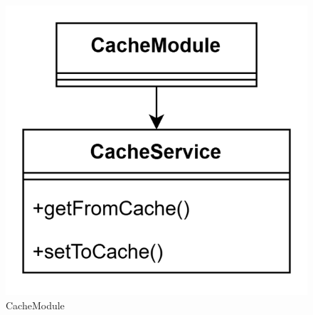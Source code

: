 \begin{itemize}
    \begin{figure}[h!] \centering       
        \includegraphics[scale = 0.3]{template/images/uml_back/CacheModule.png}
        \caption{CacheModule}
    \end{figure}
\end{itemize}

